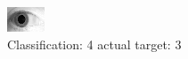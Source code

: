 \begin{figure}[h!]
\begin{center}
\includegraphics[width=0.60\columnwidth]{figures/ID1876_class_4_target_3.png}
\end{center}
\caption{ Classification: 4 actual target: 3}
\label{fig:ID1876_class_4_target_3}
\end{figure}
